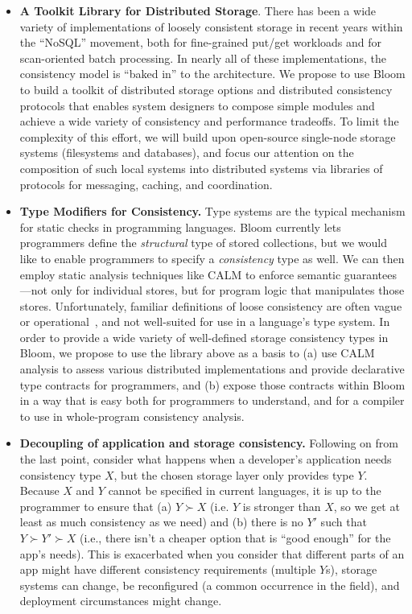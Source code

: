 \begin{itemize}
\item \textbf{A Toolkit Library for Distributed Storage}.  There has been a wide
  variety of implementations of loosely consistent storage in recent years within the ``NoSQL'' movement, both for fine-grained put/get workloads and for scan-oriented batch processing.  In nearly all of these implementations, the consistency model is ``baked in'' to the architecture.  We propose to use Bloom to build a toolkit of distributed storage options and distributed consistency protocols that enables system designers to compose simple modules and achieve a wide variety of consistency and performance tradeoffs.  To limit the complexity of this effort, we will build upon open-source single-node storage systems (filesystems and databases), and focus our attention on the composition of such local systems into distributed systems via libraries of protocols for messaging, caching, and coordination.

\item \textbf{Type Modifiers for Consistency.}  Type systems are the typical mechanism for static checks in programming languages.  Bloom currently lets programmers define the \emph{structural} type of stored collections, but we would like to enable programmers to specify a \emph{consistency} type as well.  We can then employ static analysis techniques like CALM to enforce semantic guarantees---not only for individual stores, but for program logic that manipulates those stores.  Unfortunately, familiar definitions of loose consistency are often vague or operational~\cite{bayou,Vogels}, and not well-suited for use in a language's type system.  In order to provide a wide variety of well-defined storage consistency types in Bloom, we propose to use the library above as a basis to (a) use CALM analysis to assess various distributed implementations and provide declarative type contracts for programmers, and (b) expose those contracts within Bloom in a way that is easy both for programmers to understand, and for a compiler to use in whole-program consistency analysis.

\item \textbf{Decoupling of application and storage consistency.}  Following on from the last point, consider what happens when a developer's application needs consistency type $X$, but the chosen storage layer only provides type $Y$.  Because $X$ and $Y$ cannot be specified in current languages, it is up to the programmer to ensure that (a) $Y \succ X$  (i.e. $Y$ is stronger than $X$, so we get at least as much consistency as we need) and (b) there is no $Y'$ such that $Y \succ Y' \succ  X$ (i.e.,
there isn't a cheaper option that is ``good enough'' for the app's
needs). This is exacerbated when you consider that different parts of
an app might have different consistency requirements (multiple $Y$s),
storage systems can change, be reconfigured (a common occurrence in the field), and deployment circumstances might change.


\end{itemize}
